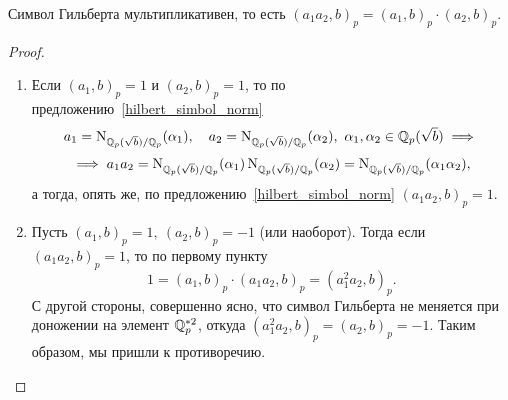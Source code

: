 	\begin{statement}\label{hilb_mult} 
		Символ Гильберта мультипликативен, то есть $(a_1 a_2, b)_p = (a_1, b)_p \cdot (a_2, b)_p$.
	\end{statement}
	\begin{proof}
		\begin{enumerate}
			\item Если $(a_1, b)_p = 1$ и $(a_2, b)_p = 1$, то по предложению~\ref{hilbert_simbol_norm}
			\[
				a_1 = \operatorname{\mathrm{N}}_{\mathbb{Q}_{p}(\sqrt{b})/\mathbb{Q}_{p}}(\alpha_1), \quad a_2 = \operatorname{\mathrm{N}}_{\mathbb{Q}_{p}(\sqrt{b})/\mathbb{Q}_{p}}(\alpha_2), \ \alpha_1, \alpha_2 \in \mathbb{Q}_{p}(\sqrt{b}) \implies 
			\]
			\[
				\implies a_1 a_2 =   \operatorname{\mathrm{N}}_{\mathbb{Q}_{p}(\sqrt{b})/\mathbb{Q}_{p}}(\alpha_1) \operatorname{\mathrm{N}}_{\mathbb{Q}_{p}(\sqrt{b})/\mathbb{Q}_{p}}(\alpha_2) = \operatorname{\mathrm{N}}_{\mathbb{Q}_{p}(\sqrt{b})/\mathbb{Q}_{p}}(\alpha_1 \alpha_2),
			\]
			а тогда, опять же, по предложению~\ref{hilbert_simbol_norm} $(a_1 a_2, b)_{p} = 1$.

			\item Пусть $(a_1, b)_{p} = 1, \ (a_{2}, b)_{p} = -1$ (или наоборот). Тогда если $(a_1 a_2, b)_{p} = 1$, то по первому пункту 
			\[
			 	1 = (a_1, b)_{p} \cdot (a_1 a_2, b)_{p} = (a_1^{2}a_2, b)_{p}.
			 \] 
			 С другой стороны, совершенно ясно, что символ Гильберта не меняется при доножении на элемент $\mathbb{Q}_{p}^{*2}$, откуда $(a_1^{2}a_2, b)_{p} = (a_2, b)_{p} = -1$. Таким образом, мы пришли к противоречию. 


\end{enumerate}
\end{proof}
